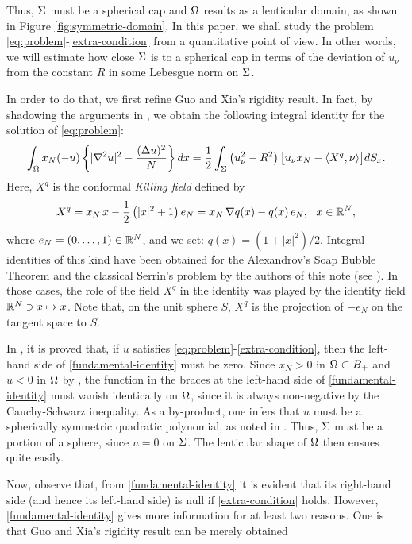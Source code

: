 \documentclass[a4paper,10pt]{amsart}
\numberwithin{equation}{section}
\begin{document}
Thus, $\Sigma$ must be a spherical cap and $\Omega$ results as a lenticular domain, as shown in Figure \ref{fig:symmetric-domain}.  In this paper, we shall study 
the problem \eqref{eq:problem}-\eqref{extra-condition} from a quantitative point of view. In other words, we will estimate how close $\Sigma$ is to a spherical cap in terms of the deviation of $u_\nu$ from the constant $R$ in some Lebesgue norm on $\Sigma$.
\par
In order to do that, we first refine Guo and Xia's rigidity result. In fact, by shadowing the arguments in \cite{GX}, we obtain the following integral identity for the solution of \eqref{eq:problem}:
\begin{equation}
\label{fundamental-identity}
\int_\Omega x_N (-u) \left\{ | \nabla^2 u|^2- \frac{(\Delta u)^2}{N} \right\} dx = \\
\frac{1}{2} \int_\Sigma \left( u_\nu^2 - R^2 \right) \bigl[ u_\nu x_N - \langle X^q, \nu\rangle \bigr]  dS_x.
\end{equation}
Here, $X^q$ is the conformal \textit{Killing field} defined by
\begin{equation}
\label{Killing}
X^q=x_N\, x -\frac{1}{2} \left( |x|^2 +1 \right) e_N=x_N\, \nabla q(x) -q(x)\, e_N, \ \ x\in\mathbb{R}^N,
\end{equation}
where $e_N=(0,\dots, 1)\in\mathbb{R}^N$, and we set: $q(x)=(1+|x|^2)/2$. 
Integral identities of this kind have been obtained for the Alexandrov's Soap Bubble Theorem and the classical Serrin's problem by the authors of this note (see \cite{MP, MP2, MP3, Pog2}). In those cases, the role of the field $X^q$ in the identity was played by the identity field $\mathbb{R}^N\ni x\mapsto x$. Note that, on the unit sphere $S$, $X^q$ is the projection of $-e_N$ on the tangent space to $S$.
\par
In \cite{GX}, it is proved that, if $u$ satisfies \eqref{eq:problem}-\eqref{extra-condition}, then the left-hand side of \eqref{fundamental-identity} must be zero. Since $x_N>0$ in $\Omega\subset B_+$ and $u<0$ in $\Omega$ by \cite[Proposition 2.3]{GX}, the function in the braces at the left-hand side of \eqref{fundamental-identity}
must vanish identically on $\Omega$, since it is always non-negative by the Cauchy-Schwarz inequality. As a by-product, one infers that $u$ must be a spherically symmetric quadratic polynomial, as noted in \cite{MP}. Thus, $\Sigma$ must be a portion of a sphere, since $u=0$ on $\Sigma$. The lenticular shape of $\Omega$ then ensues quite easily.
\par
Now, observe that, from \eqref{fundamental-identity} it is evident that its right-hand side (and hence its left-hand side) is null if \eqref{extra-condition} holds. However, \eqref{fundamental-identity} gives more information for at least two reasons. One is that Guo and Xia's rigidity result can be merely obtained
\end{document}
